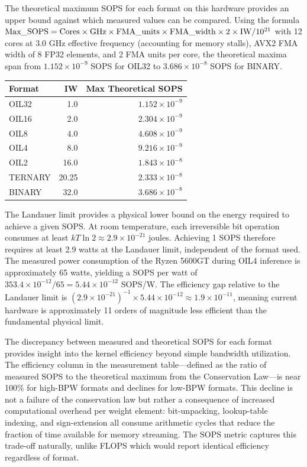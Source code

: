 The theoretical maximum SOPS for each format on this hardware provides an upper bound against which measured values can be compared. Using the formula $\text{Max\_SOPS} = \text{Cores} \times \text{GHz} \times \text{FMA\_units} \times \text{FMA\_width} \times 2 \times \mathrm{IW} / 10^{21}$ with 12 cores at 3.0 GHz effective frequency (accounting for memory stalls), AVX2 FMA width of 8 FP32 elements, and 2 FMA units per core, the theoretical maxima span from $1.152 \times 10^{-9}$ SOPS for OIL32 to $3.686 \times 10^{-8}$ SOPS for BINARY.

\begin{center}
\tablestyle
\begin{tabular}{lrr}
\toprule
\textbf{Format} & \textbf{IW} & \textbf{Max Theoretical SOPS} \\
\midrule
OIL32 & 1.0 & $1.152 \times 10^{-9}$ \\
OIL16 & 2.0 & $2.304 \times 10^{-9}$ \\
OIL8 & 4.0 & $4.608 \times 10^{-9}$ \\
OIL4 & 8.0 & $9.216 \times 10^{-9}$ \\
OIL2 & 16.0 & $1.843 \times 10^{-8}$ \\
TERNARY & 20.25 & $2.333 \times 10^{-8}$ \\
BINARY & 32.0 & $3.686 \times 10^{-8}$ \\
\bottomrule
\end{tabular}
\end{center}

The Landauer limit provides a physical lower bound on the energy required to achieve a given SOPS. At room temperature, each irreversible bit operation consumes at least $kT \ln 2 \approx 2.9 \times 10^{-21}$ joules. Achieving 1 SOPS therefore requires at least 2.9 watts at the Landauer limit, independent of the format used. The measured power consumption of the Ryzen 5600GT during OIL4 inference is approximately 65 watts, yielding a SOPS per watt of $353.4 \times 10^{-12} / 65 = 5.44 \times 10^{-12}$ SOPS/W. The efficiency gap relative to the Landauer limit is $(2.9 \times 10^{-21})^{-1} \times 5.44 \times 10^{-12} \approx 1.9 \times 10^{-11}$, meaning current hardware is approximately 11 orders of magnitude less efficient than the fundamental physical limit.

The discrepancy between measured and theoretical SOPS for each format provides insight into the kernel efficiency beyond simple bandwidth utilization. The efficiency column in the measurement table---defined as the ratio of measured SOPS to the theoretical maximum from the Conservation Law---is near 100\% for high-BPW formats and declines for low-BPW formats. This decline is not a failure of the conservation law but rather a consequence of increased computational overhead per weight element: bit-unpacking, lookup-table indexing, and sign-extension all consume arithmetic cycles that reduce the fraction of time available for memory streaming. The SOPS metric captures this trade-off naturally, unlike FLOPS which would report identical efficiency regardless of format.

